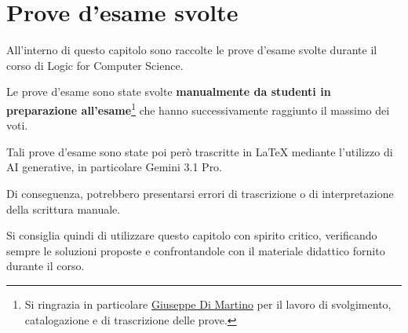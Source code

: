 \chapter{Prove d'esame svolte}

All'interno di questo capitolo sono raccolte le prove d'esame svolte durante il corso di Logic for Computer Science.

Le prove d'esame sono state svolte \textbf{manualmente da studenti in preparazione all'esame}\footnote{Si ringrazia in particolare \href{https://github.com/giuseppedima}{Giuseppe Di Martino} per il lavoro di svolgimento, catalogazione e di trascrizione delle prove.} che hanno successivamente raggiunto il massimo dei voti.

Tali prove d'esame sono state poi però trascritte in \LaTeX{} mediante l'utilizzo di AI generative, in particolare Gemini 3.1 Pro.

Di conseguenza, potrebbero presentarsi errori di trascrizione o di interpretazione della scrittura manuale.

Si consiglia quindi di utilizzare questo capitolo con spirito critico, verificando sempre le soluzioni proposte e confrontandole con il materiale didattico fornito durante il corso.

















